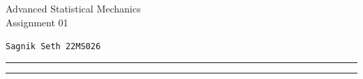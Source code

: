 \documentclass[usenames, svgnames, dvipsnames]{scrartcl}
\begin{document}
        \begin{center}
            {\rmfamily
                \Large{\textcolor{blue!30!black}{%
                    \textmd{{\Large{{A}}}}dvanced {\Large S}tatistical {\Large M}echanics \\
                     {\Large Assignment} 01%
                }}\\[0.4cm]
            }
            \end{center}
        \begin{center}
           \large \texttt{{{\LARGE  S}agnik {\LARGE S}eth\hspace{0.3cm} 22MS026 }}
        \end{center}
\hrule
\vspace{0.08cm}
\hrule
\vspace{0.6cm}




\end{document}
